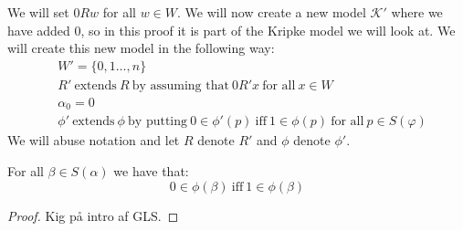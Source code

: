\documentclass[../main.tex]{subfiles}
\begin{document}
We will set $0Rw$ for all $w\in W$. We will now create a new model
$\mathcal{K'}$ where we have added $0$, so in this proof it is part of the
Kripke model we will look at. We will create this new model in the
following way:
\begin{align*}
	&W'=\{0,1\ldots,n\}\\
	&R'\ \text{extends}\ R\ \text{by assuming that}\ 0R'x\ \text{for all}\
	x\in W\\
	&\alpha_0=0\\
	&\phi'\ \text{extends}\ \phi\ \text{by putting}\ 0\in\phi'(p)\
	\text{iff}\ 1\in\phi(p)\ \text{for all}\ p\in S(\varphi)
\end{align*}
We will abuse notation and let $R$ denote $R'$ and $\phi$ denote $\phi'$.
\begin{lem}
	For all $\beta\in S(\alpha)$ we have that:
	$$0\in\phi(\beta)\ \text{iff}\ 1\in\phi(\beta) $$
\end{lem}
\begin{proof}
	Kig på intro af GLS.
\end{proof}
\end{document}
